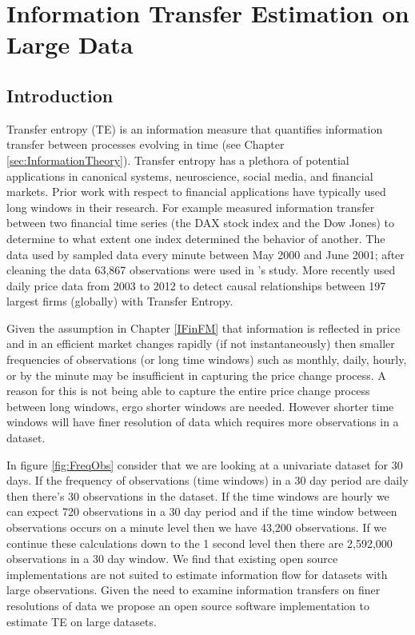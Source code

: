 \chapter{ Information Transfer Estimation on Large Data} \label{Chapter:PyIF}

\section{Introduction}

Transfer entropy (TE) is an information measure that quantifies information transfer between processes evolving in time (see Chapter \ref{sec:InformationTheory}). Transfer entropy has a plethora of potential applications in  canonical systems, neuroscience, social media, and financial markets. Prior work with respect to financial applications have typically used long windows in their research. For example \cite{Kantz} measured information transfer between two financial time series (the DAX stock index and the Dow Jones) to determine to what extent one index determined the behavior of another. The data used by \cite{Kantz} sampled data every minute between May 2000 and June 2001; after cleaning the data 63,867 observations were used in \cite{Kantz}'s study.  More recently \cite{Sandoval} used daily price data from 2003 to 2012 to detect causal relationships between 197 largest firms (globally) with Transfer Entropy.

Given the assumption in Chapter \ref{IFinFM} that information is reflected in price and in an efficient market changes rapidly (if not instantaneously) then smaller frequencies of observations (or long time windows) such as monthly, daily, hourly, or by the minute may be insufficient in capturing the price change process.  A reason for this is not being able to capture the entire price change process between long windows, ergo shorter windows are needed. However shorter time windows will have finer resolution of data which requires more observations in a dataset.  %

In figure \ref{fig:FreqObs} consider that we are looking at a univariate dataset for 30 days.  If the frequency of observations (time windows) in a 30 day period are daily then there's  30 observations in the dataset.  If the time windows are hourly we can expect 720 observations  in a 30 day period and if the time window between observations occurs on a minute level then we have 43,200 observations.  If we continue these calculations down to the 1 second level then there are 2,592,000 observations in a 30 day window.  We find that existing open source implementations are not suited to estimate information flow for datasets with large observations.  Given the need to examine information transfers on finer resolutions of data we propose an open source software implementation to estimate TE on large datasets.

